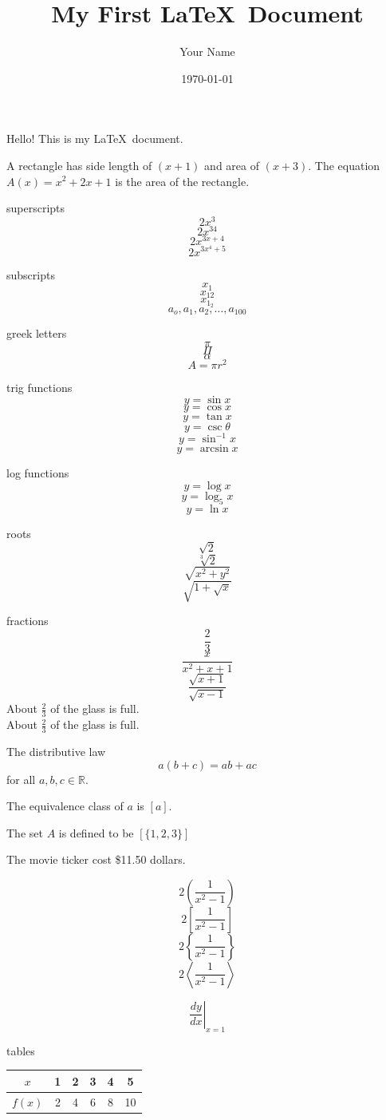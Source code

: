 \documentclass[10pt, letterpaper]{article}
\title{My First \LaTeX\ Document}
\author{Your Name}
\date{\today}
\newcommand{\set}[1]{\setlength\itemsep{#1em}} %
\begin{document}
\set{1.2}
\tableofcontents
\maketitle

Hello! This is my \LaTeX\ document.

A rectangle has side length of $(x+1)$ and area of $(x+3)$. The equation $A(x)=x^2+2x+1$ is the area of the rectangle.


superscripts $$2x^3$$
$$2x^{34}$$
$$2x^{3x+4}$$
$$2x^{3x^4+5}$$

subscripts $$x_1$$
$$x_{12}$$
$$x_{1_2}$$
$$a_o,a_1,a_2,\ldots,a_{100}$$

greek letters $$\pi$$
$$\Pi$$
$$\alpha$$
$$A=\pi r^2$$

trig functions $$y=\sin x$$
$$y=\cos x$$
$$y=\tan x$$
$$y=\csc \theta$$
$$y=\sin^{-1} x$$
$$y=\arcsin x$$

log functions $$y=\log x$$
$$y=\log_5 x$$
$$y=\ln x$$

roots $$\sqrt{2}$$
$$\sqrt[3]{2}$$
$$\sqrt{x^2+y^2}$$
$$\sqrt{1+\sqrt{x}}$$

fractions $$\frac{2}{3}$$
$$\frac{x}{x^2+x+1}$$
$$\frac{\sqrt{x+1}}{\sqrt{x-1}}$$
About $\displaystyle \frac{2}{3}$ of the glass is full.\\[16pt]
About $\displaystyle \frac{2}{3}$ of the glass is full.

The distributive law $$a(b+c)=ab+ac$$ for all $a, b, c \in \mathbb{R}$.

The equivalence class of $a$ is $[a]$.

The set $A$ is defined to be $[\{1, 2, 3\}]$

The movie ticker cost \$11.50 dollars.

$$2\left(\frac{1}{x^2-1}\right)$$ 
$$2\left[\frac{1}{x^2-1}\right]$$ 
$$2\left\{\frac{1}{x^2-1}\right\}$$
$$2\left\langle\frac{1}{x^2-1}\right\rangle$$

$$\left.\frac{dy}{dx}\right|_{x=1}$$


tables\\[6pt]
\begin{tabular}{|c||c|c|c|c|c|}
 \hline
 $x$ & 1 & 2 & 3 & 4 & 5 \\ \hline
 $f(x)$ & 2 & 4 & 6 & 8 & 10 \\ \hline
\end{tabular}

\vspace{1cm}
\end{document}
